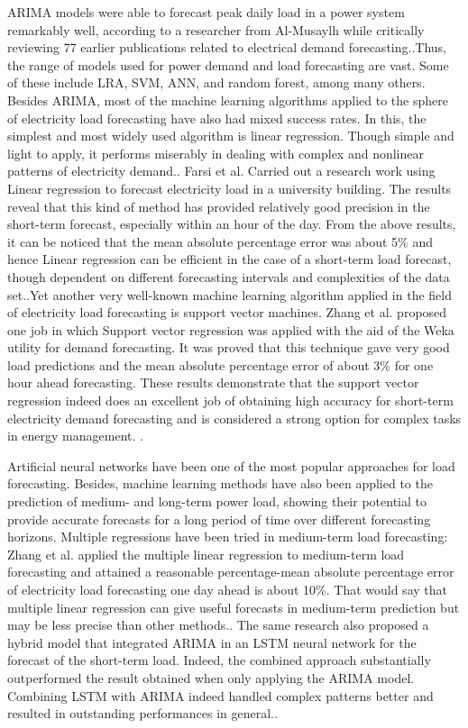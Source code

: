 \documentclass[12pt, a4paper,twoside]{report}
\theoremstyle{plain} %
\theoremstyle{definition} %
\theoremstyle{remark} %
\numberwithin{equation}{chapter}
\begin{document}
ARIMA models were able to forecast peak daily load in a power system remarkably well, according to a researcher from Al-Musaylh while critically reviewing 77 earlier publications related to electrical demand forecasting.\cite{al2018short}.Thus, the range of models used for power demand and load forecasting are vast. Some of these include LRA, SVM, ANN, and random forest, among many others. Besides ARIMA, most of the machine learning algorithms applied to the sphere of electricity load forecasting have also had mixed success rates. In this, the simplest and most widely used algorithm is linear regression. Though simple and light to apply, it performs miserably in dealing with complex and nonlinear patterns of electricity demand.\cite{long2022prophet}.
Farsi et al. Carried out a research work using Linear regression to forecast electricity load in a university building. The results reveal that this kind of method has provided relatively good precision in the short-term forecast, especially within an hour of the day. From the above results, it can be noticed that the mean absolute percentage error was about 5\% and hence Linear regression can be efficient in the case of a short-term load forecast, though dependent on different forecasting intervals and complexities of the data set.\cite{hafeez2020electric}.Yet another very well-known machine learning algorithm applied in the field of electricity load forecasting is support vector machines. Zhang et al. proposed one job in which Support vector regression was applied with the aid of the Weka utility for demand forecasting. It was proved that this technique gave very good load predictions and the mean absolute percentage error of about 3\% for one hour ahead forecasting. These results demonstrate that the support vector regression indeed does an excellent job of obtaining high accuracy for short-term electricity demand forecasting and is considered a strong option for complex tasks in energy management. \cite{zhang2021review}. 
\newline

Artificial neural networks have been one of the most popular approaches for load forecasting. Besides, machine learning methods have also been applied to the prediction of medium- and long-term power load, showing their potential to provide accurate forecasts for a long period of time over different forecasting horizons. Multiple regressions have been tried in medium-term load forecasting: Zhang et al. applied the multiple linear regression to medium-term load forecasting and attained a reasonable percentage-mean absolute percentage error of electricity load forecasting one day ahead is about 10\%. That would say that multiple linear regression can give useful forecasts in medium-term prediction but may be less precise than other methods.\cite{zhang2021review}. The same research also proposed a hybrid model that integrated ARIMA in an LSTM neural network for the forecast of the short-term load. Indeed, the combined approach substantially outperformed the result obtained when only applying the ARIMA model. Combining LSTM with ARIMA indeed handled complex patterns better and resulted in outstanding performances in general.\cite{zhang2021review}. 
\newline
\end{document}
